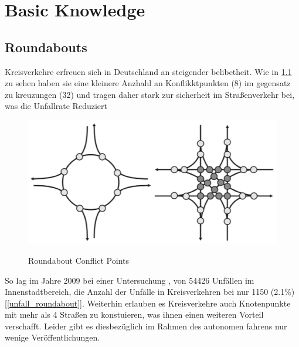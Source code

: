 \chapter{Basic Knowledge}

\section{Roundabouts}
Kreisverkehre erfreuen sich in Deutschland an steigender belibetheit.  Wie in \cref{conflict_roundabout} zu sehen  haben sie eine kleinere Anzhahl an Konflikktpunkten (8)
im gegensatz zu kreuzungen (32) und  tragen daher stark zur sicherheit im Straßenverkehr bei, was die Unfallrate Reduziert

\begin{figure}[!ht]
\caption{Roundabout Conflict Points \cite{man06}}
 \includegraphics[width=\textwidth]{bilder/conflict.png}
\label{conflict_roundabout}
\end{figure}

So lag im Jahre 2009 bei einer Untersuchung \cite{Bondzio2012}, von 54426 Unfällen im Innenstadtbereich, die Anzahl der Unfälle in Kreisverkehren bei nur 1150 (2.1\%) [\cref{unfall_roundabout}].
Weiterhin erlauben es Kreisverkehre auch Knotenpunkte mit mehr als 4 Straßen zu konstuieren, was ihnen einen weiteren Vorteil verschafft.
Leider gibt es diesbezüglich im Rahmen des autonomen fahrens nur wenige Veröffentlichungen.

